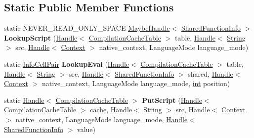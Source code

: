 \subsection*{Static Public Member Functions}
\begin{DoxyCompactItemize}
\item 
\mbox{\label{classv8_1_1internal_1_1CompilationCacheTable_a817c4c107b117b41bc60f1c33016f716}} 
static N\+E\+V\+E\+R\+\_\+\+R\+E\+A\+D\+\_\+\+O\+N\+L\+Y\+\_\+\+S\+P\+A\+CE \mbox{\hyperlink{classv8_1_1internal_1_1MaybeHandle}{Maybe\+Handle}}$<$ \mbox{\hyperlink{classv8_1_1internal_1_1SharedFunctionInfo}{Shared\+Function\+Info}} $>$ {\bfseries Lookup\+Script} (\mbox{\hyperlink{classv8_1_1internal_1_1Handle}{Handle}}$<$ \mbox{\hyperlink{classv8_1_1internal_1_1CompilationCacheTable}{Compilation\+Cache\+Table}} $>$ table, \mbox{\hyperlink{classv8_1_1internal_1_1Handle}{Handle}}$<$ \mbox{\hyperlink{classv8_1_1internal_1_1String}{String}} $>$ src, \mbox{\hyperlink{classv8_1_1internal_1_1Handle}{Handle}}$<$ \mbox{\hyperlink{classv8_1_1internal_1_1Context}{Context}} $>$ native\+\_\+context, Language\+Mode language\+\_\+mode)
\item 
\mbox{\label{classv8_1_1internal_1_1CompilationCacheTable_a82e8867b94f0008002331227264ed6b1}} 
static \mbox{\hyperlink{classv8_1_1internal_1_1InfoCellPair}{Info\+Cell\+Pair}} {\bfseries Lookup\+Eval} (\mbox{\hyperlink{classv8_1_1internal_1_1Handle}{Handle}}$<$ \mbox{\hyperlink{classv8_1_1internal_1_1CompilationCacheTable}{Compilation\+Cache\+Table}} $>$ table, \mbox{\hyperlink{classv8_1_1internal_1_1Handle}{Handle}}$<$ \mbox{\hyperlink{classv8_1_1internal_1_1String}{String}} $>$ src, \mbox{\hyperlink{classv8_1_1internal_1_1Handle}{Handle}}$<$ \mbox{\hyperlink{classv8_1_1internal_1_1SharedFunctionInfo}{Shared\+Function\+Info}} $>$ shared, \mbox{\hyperlink{classv8_1_1internal_1_1Handle}{Handle}}$<$ \mbox{\hyperlink{classv8_1_1internal_1_1Context}{Context}} $>$ native\+\_\+context, Language\+Mode language\+\_\+mode, \mbox{\hyperlink{classint}{int}} position)
\item 
\mbox{\label{classv8_1_1internal_1_1CompilationCacheTable_a13cf82d8ce2e8b030514adee82088560}} 
static \mbox{\hyperlink{classv8_1_1internal_1_1Handle}{Handle}}$<$ \mbox{\hyperlink{classv8_1_1internal_1_1CompilationCacheTable}{Compilation\+Cache\+Table}} $>$ {\bfseries Put\+Script} (\mbox{\hyperlink{classv8_1_1internal_1_1Handle}{Handle}}$<$ \mbox{\hyperlink{classv8_1_1internal_1_1CompilationCacheTable}{Compilation\+Cache\+Table}} $>$ cache, \mbox{\hyperlink{classv8_1_1internal_1_1Handle}{Handle}}$<$ \mbox{\hyperlink{classv8_1_1internal_1_1String}{String}} $>$ src, \mbox{\hyperlink{classv8_1_1internal_1_1Handle}{Handle}}$<$ \mbox{\hyperlink{classv8_1_1internal_1_1Context}{Context}} $>$ native\+\_\+context, Language\+Mode language\+\_\+mode, \mbox{\hyperlink{classv8_1_1internal_1_1Handle}{Handle}}$<$ \mbox{\hyperlink{classv8_1_1internal_1_1SharedFunctionInfo}{Shared\+Function\+Info}} $>$ value)

\end{DoxyCompactItemize}
